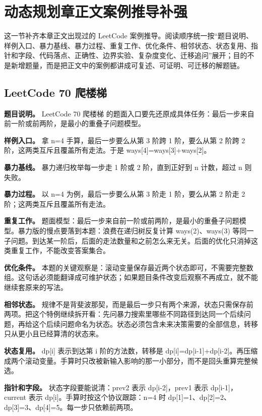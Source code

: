 \section{动态规划章正文案例推导补强}

这一节补齐本章正文出现过的 LeetCode 案例推导。阅读顺序统一按“题目说明、样例入口、暴力基线、暴力过程、重复工作、优化条件、相邻状态、状态复用、指针和字段、代码落点、正确性、边界实验、复杂度变化、迁移追问”展开；目的不是新增题量，而是把正文中的案例都讲成可复述、可证明、可迁移的解题链。

\subsection{LeetCode 70 爬楼梯}

\textbf{题目说明。} LeetCode 70 爬楼梯 的题面入口要先还原成具体任务：最后一步来自前一阶或前两阶，是最小的重叠子问题模型。

\textbf{样例入口。} 拿 n=4 手算，最后一步要么从第 3 阶跨 1 阶，要么从第 2 阶跨 2 阶，这两类互斥且覆盖所有走法。于是 ways[4]=ways[3]+ways[2]。

\textbf{暴力基线。} 暴力递归枚举每一步走 1 阶或 2 阶，直到正好到 n 计数，超过 n 则失败。

\textbf{暴力过程。} 以 n=4 为例，最后一步要么从第 3 阶走 1 阶，要么从第 2 阶走 2 阶；这两类互斥且覆盖所有走法。

\textbf{重复工作。} 题面模型：最后一步来自前一阶或前两阶，是最小的重叠子问题模型。暴力版的慢点要落到本题：浪费在递归树反复计算 ways(2)、ways(3) 等同一子问题。到达某一阶后，后面的走法数量和之前怎么来无关。后面的优化只消掉这类重复工作，不能改变答案集合。

\textbf{优化条件。} 本题的关键观察是：滚动变量保存最近两个状态即可，不需要完整数组。这句话必须能翻译成可维护状态；如果题目条件改变后观察不再成立，就不能继续套原来的写法。

\textbf{相邻状态。} 规律不是背斐波那契，而是最后一步只有两个来源，状态只需保存前两项。把这个特例继续拆开看：先问暴力搜索里哪些不同路径到达同一个后续问题，再给这个后续问题命名为状态。状态必须包含未来决策需要的全部信息，转移只从更小且已经算清的状态来。

\textbf{状态复用。} dp[i] 表示到达第 i 阶的方法数，转移是 dp[i]=dp[i-1]+dp[i-2]。再压缩成两个滚动变量。手算时只改被新输入影响的那一小部分，而不是回头重算完整候选。

\textbf{指针和字段。} 状态字段要能说清：prev2 表示 dp[i-2]，prev1 表示 dp[i-1]，current 表示 dp[i]。手算时按这个协议跟踪：n=4 时 dp[1]=1、dp[2]=2、dp[3]=3、dp[4]=5。每一步只依赖前两项。

